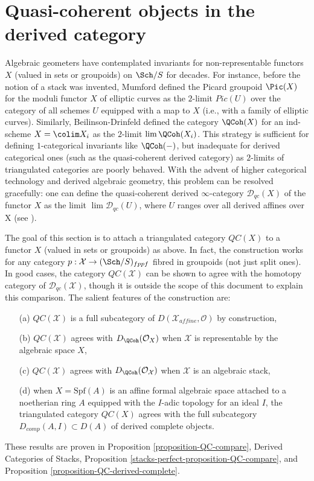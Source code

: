 \section{Quasi-coherent objects in the derived category}
\label{section-QC}

\noindent
Algebraic geometers have contemplated invariants for non-representable
functors $X$ (valued in sets or groupoids) on $\Sch/S$ for decades.
For instance,
before the notion of a stack was invented, Mumford defined \cite{mumford_picard}
the Picard groupoid $\Pic(X)$ for the moduli functor $X$ of elliptic curves
as the $2$-limit $Pic(U)$ over the category of all schemes $U$
equipped with a map to $X$ (i.e., with a family of elliptic curves).
Similarly, Beilinson-Drinfeld defined \cite{BVGD} the category
$\QCoh(X)$ for an ind-scheme $X = \colim X_i$ as the $2$-limit
$\lim \QCoh(X_i)$.
This strategy is sufficient for defining $1$-categorical invariants
like $\QCoh(-)$, but inadequate for derived categorical ones
(such as the quasi-coherent derived category) as $2$-limits
of triangulated categories are poorly behaved.
With the advent of higher categorical technology
and derived algebraic geometry, this problem can be
resolved gracefully: one can define the quasi-coherent
derived $\infty$-category $\mathcal{D}_{qc}(X)$ of the functor $X$
as the limit $\lim \mathcal{D}_{qc}(U)$, where $U$
ranges over all derived affines over X (see \cite{lurie-thesis}).

\medskip\noindent
The goal of this section is to attach a triangulated category
$\mathit{QC}(X)$ to a functor $X$ (valued in sets or groupoids)
as above. In fact, the construction works for any category
$p : \mathcal{X} \to (\Sch/S)_{fppf}$ fibred in groupoids
(not just split ones). In good cases, the category $\mathit{QC}(\mathcal{X})$
can be shown to agree with the homotopy category of
$\mathcal{D}_{qc}(\mathcal{X})$,
though it is outside the scope of this document to explain this comparison.
The salient features of the construction are:
\begin{enumerate}
\item[(a)] $\mathit{QC}(\mathcal{X})$ is a full subcategory of
$D(\mathcal{X}_{affine}, \mathcal{O})$ by construction,
\item[(b)] $\mathit{QC}(\mathcal{X})$ agrees with $D_\QCoh(\mathcal{O}_X)$
when $\mathcal{X}$ is representable by the algebraic space $X$, 
\item[(c)] $\mathit{QC}(\mathcal{X})$ agrees with
$D_\QCoh(\mathcal{O}_\mathcal{X})$ when $\mathcal{X}$ is an algebraic stack,
\item[(d)] when $X = \text{Spf}(A)$ is an affine formal algebraic space
attached to a noetherian ring $A$ equipped with the $I$-adic topology
for an ideal $I$, the triangulated category
$\mathit{QC}(X)$ agrees with the full subcategory
$D_{comp}(A, I) \subset D(A)$ of derived complete objects.
\end{enumerate}
These results are proven in
Proposition \ref{proposition-QC-compare},
Derived Categories of Stacks, Proposition
\ref{stacks-perfect-proposition-QC-compare}, and
Proposition \ref{proposition-QC-derived-complete}.

